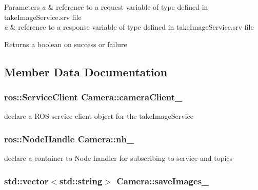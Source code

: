 \begin{DoxyParams}{Parameters}
{\em a} & reference to a request variable of type defined in take\+Image\+Service.\+srv file \\
\hline
{\em a} & reference to a response variable of type defined in take\+Image\+Service.\+srv file \\
\hline
\end{DoxyParams}
\begin{DoxyReturn}{Returns}
a boolean on success or failure 
\end{DoxyReturn}


\subsection{Member Data Documentation}
\subsubsection[{\texorpdfstring{camera\+Client\+\_\+}{cameraClient_}}]{\setlength{\rightskip}{0pt plus 5cm}ros\+::\+Service\+Client Camera\+::camera\+Client\+\_\+\hspace{0.3cm}{\ttfamily [private]}}\hypertarget{classCamera_a93ed3666fbe5146aa32cc028b27db4bd}{}\label{classCamera_a93ed3666fbe5146aa32cc028b27db4bd}


declare a R\+OS service client object for the take\+Image\+Service 

\subsubsection[{\texorpdfstring{nh\+\_\+}{nh_}}]{\setlength{\rightskip}{0pt plus 5cm}ros\+::\+Node\+Handle Camera\+::nh\+\_\+\hspace{0.3cm}{\ttfamily [private]}}\hypertarget{classCamera_a888df900bc4c72a61dbb9b0b609c3cf8}{}\label{classCamera_a888df900bc4c72a61dbb9b0b609c3cf8}


declare a container to Node handler for subscribing to service and topics 

\subsubsection[{\texorpdfstring{save\+Images\+\_\+}{saveImages_}}]{\setlength{\rightskip}{0pt plus 5cm}std\+::vector$<$std\+::string$>$ Camera\+::save\+Images\+\_\+\hspace{0.3cm}{\ttfamily [private]}}\hypertarget{classCamera_a9ffeac410066cafa8538041f66830067}{}\label{classCamera_a9ffeac410066cafa8538041f66830067}


